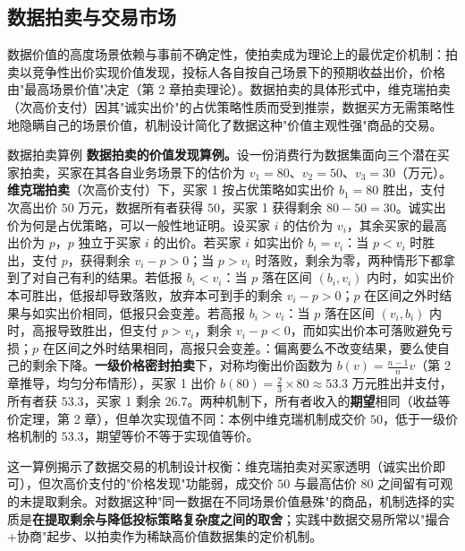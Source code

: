 \subsection{数据拍卖与交易市场}

数据价值的高度场景依赖与事前不确定性，使拍卖成为理论上的最优定价机制：拍卖以竞争性出价实现价值发现，投标人各自按自己场景下的预期收益出价，价格由"最高场景价值"决定（第 2 章拍卖理论）。数据拍卖的具体形式中，维克瑞拍卖（次高价支付）因其"诚实出价"的占优策略性质而受到推崇，数据买方无需策略性地隐瞒自己的场景价值，机制设计简化了数据这种"价值主观性强"商品的交易。

\begin{derivation}{数据拍卖算例}{}
\textbf{数据拍卖的价值发现算例。}设一份消费行为数据集面向三个潜在买家拍卖，买家在其各自业务场景下的估价为 $v_1 = 80$、$v_2 = 50$、$v_3 = 30$（万元）。\textbf{维克瑞拍卖}（次高价支付）下，买家 1 按占优策略如实出价 $b_1 = 80$ 胜出，支付次高出价 $50$ 万元，数据所有者获得 $50$，买家 1 获得剩余 $80 - 50 = 30$。诚实出价为何是占优策略，可以一般性地证明。设买家 $i$ 的估价为 $v_i$，其余买家的最高出价为 $p$，$p$ 独立于买家 $i$ 的出价。若买家 $i$ 如实出价 $b_i = v_i$：当 $p < v_i$ 时胜出，支付 $p$，获得剩余 $v_i - p > 0$；当 $p > v_i$ 时落败，剩余为零，两种情形下都拿到了对自己有利的结果。若低报 $b_i < v_i$：当 $p$ 落在区间 $(b_i, v_i)$ 内时，如实出价本可胜出，低报却导致落败，放弃本可到手的剩余 $v_i - p > 0$；$p$ 在区间之外时结果与如实出价相同，低报只会变差。若高报 $b_i > v_i$：当 $p$ 落在区间 $(v_i, b_i)$ 内时，高报导致胜出，但支付 $p > v_i$，剩余 $v_i - p < 0$，而如实出价本可落败避免亏损；$p$ 在区间之外时结果相同，高报只会变差。：偏离要么不改变结果，要么使自己的剩余下降。\textbf{一级价格密封拍卖}下，对称均衡出价函数为 $b(v) = \frac{n-1}{n}v$（第 2 章推导，均匀分布情形），买家 1 出价 $b(80) = \frac{2}{3}\times 80 \approx 53.3$ 万元胜出并支付，所有者获 $53.3$，买家 1 剩余 $26.7$。两种机制下，所有者收入的\textbf{期望}相同（收益等价定理，第 2 章），但单次实现值不同：本例中维克瑞机制成交价 $50$，低于一级价格机制的 $53.3$，期望等价不等于实现值等价。
\end{derivation}

这一算例揭示了数据交易的机制设计权衡：维克瑞拍卖对买家透明（诚实出价即可），但次高价支付的"价格发现"功能弱，成交价 $50$ 与最高估价 $80$ 之间留有可观的未提取剩余。对数据这种"同一数据在不同场景价值悬殊"的商品，机制选择的实质是\textbf{在提取剩余与降低投标策略复杂度之间的取舍}；实践中数据交易所常以"撮合+协商"起步、以拍卖作为稀缺高价值数据集的定价机制。


